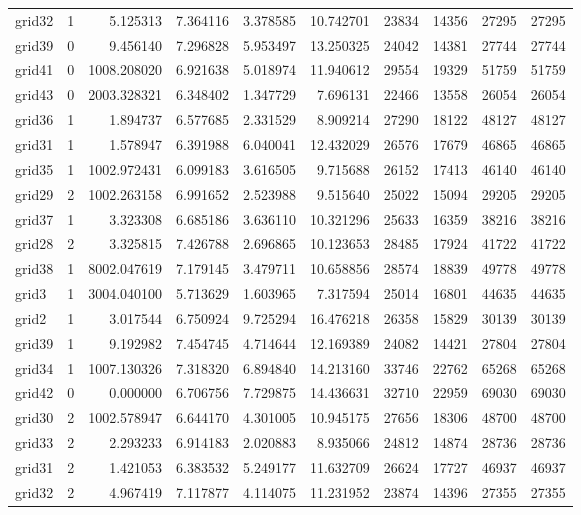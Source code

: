 \begin{longtable}{|l|r|r|r|r|r|r|r|r|r|}
grid32 & 1 & 5.125313 & 7.364116 & 3.378585 & 10.742701 & 23834 & 14356 & 27295 & 27295 \\
grid39 & 0 & 9.456140 & 7.296828 & 5.953497 & 13.250325 & 24042 & 14381 & 27744 & 27744 \\
grid41 & 0 & 1008.208020 & 6.921638 & 5.018974 & 11.940612 & 29554 & 19329 & 51759 & 51759 \\
grid43 & 0 & 2003.328321 & 6.348402 & 1.347729 & 7.696131 & 22466 & 13558 & 26054 & 26054 \\
grid36 & 1 & 1.894737 & 6.577685 & 2.331529 & 8.909214 & 27290 & 18122 & 48127 & 48127 \\
grid31 & 1 & 1.578947 & 6.391988 & 6.040041 & 12.432029 & 26576 & 17679 & 46865 & 46865 \\
grid35 & 1 & 1002.972431 & 6.099183 & 3.616505 & 9.715688 & 26152 & 17413 & 46140 & 46140 \\
grid29 & 2 & 1002.263158 & 6.991652 & 2.523988 & 9.515640 & 25022 & 15094 & 29205 & 29205 \\
grid37 & 1 & 3.323308 & 6.685186 & 3.636110 & 10.321296 & 25633 & 16359 & 38216 & 38216 \\
grid28 & 2 & 3.325815 & 7.426788 & 2.696865 & 10.123653 & 28485 & 17924 & 41722 & 41722 \\
grid38 & 1 & 8002.047619 & 7.179145 & 3.479711 & 10.658856 & 28574 & 18839 & 49778 & 49778 \\
grid3 & 1 & 3004.040100 & 5.713629 & 1.603965 & 7.317594 & 25014 & 16801 & 44635 & 44635 \\
grid2 & 1 & 3.017544 & 6.750924 & 9.725294 & 16.476218 & 26358 & 15829 & 30139 & 30139 \\
grid39 & 1 & 9.192982 & 7.454745 & 4.714644 & 12.169389 & 24082 & 14421 & 27804 & 27804 \\
grid34 & 1 & 1007.130326 & 7.318320 & 6.894840 & 14.213160 & 33746 & 22762 & 65268 & 65268 \\
grid42 & 0 & 0.000000 & 6.706756 & 7.729875 & 14.436631 & 32710 & 22959 & 69030 & 69030 \\
grid30 & 2 & 1002.578947 & 6.644170 & 4.301005 & 10.945175 & 27656 & 18306 & 48700 & 48700 \\
grid33 & 2 & 2.293233 & 6.914183 & 2.020883 & 8.935066 & 24812 & 14874 & 28736 & 28736 \\
grid31 & 2 & 1.421053 & 6.383532 & 5.249177 & 11.632709 & 26624 & 17727 & 46937 & 46937 \\
grid32 & 2 & 4.967419 & 7.117877 & 4.114075 & 11.231952 & 23874 & 14396 & 27355 & 27355 \\

\end{longtable}

